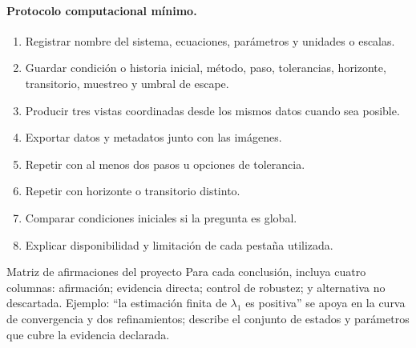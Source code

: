 \paragraph{Protocolo computacional mínimo.}
\begin{enumerate}
  \item Registrar nombre del sistema, ecuaciones, parámetros y unidades o escalas.
  \item Guardar condición o historia inicial, método, paso, tolerancias, horizonte,
  transitorio, muestreo y umbral de escape.
  \item Producir tres vistas coordinadas desde los mismos datos cuando sea posible.
  \item Exportar datos y metadatos junto con las imágenes.
  \item Repetir con al menos dos pasos u opciones de tolerancia.
  \item Repetir con horizonte o transitorio distinto.
  \item Comparar condiciones iniciales si la pregunta es global.
  \item Explicar disponibilidad y limitación de cada pestaña utilizada.
\end{enumerate}

\begin{evidencebox}{Matriz de afirmaciones del proyecto}
Para cada conclusión, incluya cuatro columnas: afirmación; evidencia directa;
control de robustez; y alternativa no descartada. Ejemplo: ``la estimación finita de
\(\lambda_1\) es positiva'' se apoya en la curva de convergencia y dos refinamientos;
describe el conjunto de estados y parámetros que cubre la evidencia declarada.
\end{evidencebox}

